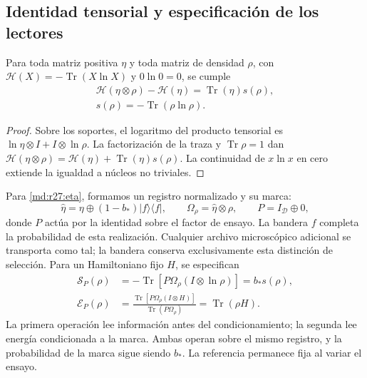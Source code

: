 \subsection{Identidad tensorial y especificación de los lectores}
\label{md:r27:lectores}
\begin{lemma}
Para toda matriz positiva $\eta$ y toda matriz de densidad $\rho$, con
$\mathscr H(X)=-\operatorname{Tr}(X\ln X)$ y $0\ln0=0$, se cumple
\begin{equation}
 \begin{gathered}
 \mathscr H(\eta\otimes\rho)-\mathscr H(\eta)
 =\operatorname{Tr}(\eta)s(\rho),\\
 s(\rho)=-\operatorname{Tr}(\rho\ln\rho).
 \end{gathered}
 \label{md:r27:tensor}
\end{equation}
\end{lemma}
\begin{proof}
Sobre los soportes, el logaritmo del producto tensorial es
$\ln\eta\otimes I+I\otimes\ln\rho$. La factorización de la traza y
$\operatorname{Tr}\rho=1$ dan
$\mathscr H(\eta\otimes\rho)=\mathscr H(\eta)+\operatorname{Tr}(\eta)s(\rho)$.
La continuidad de $x\ln x$ en cero extiende la igualdad a núcleos no triviales.
\end{proof}

Para \eqref{md:r27:eta}, formamos un registro normalizado y su marca:
\begin{equation}
 \widehat\eta=\eta\oplus(1-b_*)|f\rangle\langle f|,
 \qquad\Omega_\rho=\widehat\eta\otimes\rho,\qquad
 P=I_{\mathcal D}\oplus0,
 \label{md:r27:registro}
\end{equation}
donde $P$ actúa por la identidad sobre el factor de ensayo. La bandera $f$
completa la probabilidad de esta realización. Cualquier archivo microscópico
adicional se transporta como tal; la bandera conserva exclusivamente esta
distinción de selección. Para un Hamiltoniano fijo $H$, se especifican
\begin{equation}
 \begin{split}
 \mathcal S_P(\rho)&=-\operatorname{Tr}
 [P\Omega_\rho(I\otimes\ln\rho)]=b_*s(\rho),\\
 \mathcal E_P(\rho)&=
 \frac{\operatorname{Tr}[P\Omega_\rho(I\otimes H)]}
 {\operatorname{Tr}(P\Omega_\rho)}=\operatorname{Tr}(\rho H).
 \end{split}
 \label{md:r27:par-lector}
\end{equation}
La primera operación lee información antes del condicionamiento; la segunda
lee energía condicionada a la marca. Ambas operan sobre el mismo registro,
y la probabilidad de la marca sigue siendo $b_*$. La referencia permanece
fija al variar el ensayo.

